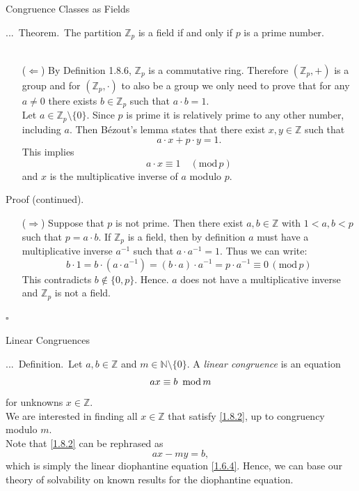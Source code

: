 \documentclass[smaller,hyperref={CJKbookmarks=true}]{beamer}
\newcommand{\N}{\mathbb{N}} \newcommand{\Z}{\mathbb{Z}} \newcommand{\Q}{\mathbb{Q}}
\newenvironment{PROOF}{{\noindent\!\sf\alert{Proof.}}\\}{\hfill$\square$\\}
\newcounter{zhuo}[subsection]
\renewcommand{\thezhuo}{\thesection.\thesubsection.\arabic{zhuo}}
\newenvironment{DEFINITION}{\stepcounter{zhuo}\alert{\thezhuo.~Definition.\,}}{}
\newenvironment{THEOREM}{\stepcounter{zhuo}\alert{\thezhuo.~Theorem.\,}}{}
\begin{document}
\begin{frame}{Congruence Classes as Fields}
\begin{spacing}{1.1}
\begin{THEOREM}
The partition $\Z_p$ is a field if and only if $p$ is a prime number.\\[4pt]
\end{THEOREM}
\begin{PROOF}
\begin{itemize}
  \item[($\Leftarrow$)] By Definition 1.8.6, $\Z_p$ is a commutative ring. Therefore $(\Z_p,+)$ is a group and for $(\Z_p,\cdot)$ to also be a group we only need to prove that for any $a\neq0$ there exists $b\in\Z_p$ such that $a\cdot b=1$.\\[4pt]
      Let $a\in\Z_p\setminus\{0\}$. Since $p$ is prime it is relatively prime to any other number, including $a$. Then B\'{e}zout's lemma states that there exist $x,y\in\Z$ such that
      \[a\cdot x+p\cdot y=1.\]
      This implies
      \[a\cdot x\equiv 1\quad(\text{mod}\,p)\]
      and $x$ is the multiplicative inverse of $a$ modulo $p$.
\end{itemize}
\newpage
\alert{Proof (continued).}\\[4pt]
\begin{itemize}
  \item[($\Rightarrow$)] Suppose that $p$ is not prime. Then there exist $a,b\in\Z$ with $1<a,b<p$ such that $p=a\cdot b$. If $\Z_p$ is a field, then by definition $a$ must have a multiplicative inverse $a^{-1}$ such that $a\cdot a^{-1}=1$. Thus we can write:
      \[b\cdot1=b\cdot(a\cdot a^{-1})=(b\cdot a)\cdot a^{-1}=p\cdot a^{-1}\equiv0\,(\text{mod}\,p)\]
      This contradicts $b\notin\{0,p\}$. Hence. $a$ does not have a multiplicative inverse and $\Z_p$ is not a field.
\end{itemize}
\end{PROOF}
\end{spacing}
\end{frame}
\begin{frame}[c]{Linear Congruences}
\begin{spacing}{1.1}
\begin{DEFINITION}
Let $a,b\in\Z$ and $m\in\N\setminus\{0\}$. A \emph{linear congruence} is an equation
\begin{equation}\label{1.8.2}
ax\equiv b\enskip\text{mod}\,m
\end{equation}
for unknowns $x\in\Z$.\\[4pt]
\end{DEFINITION}
We are interested in finding all $x\in\Z$ that satisfy \eqref{1.8.2}, up to congruency modulo $m$.\\[4pt]
Note that \eqref{1.8.2} can be rephrased as
\begin{equation}\label{1.8.3}
ax-my=b,
\end{equation}
which is simply the linear diophantine equation \eqref{1.6.4}. Hence, we can
base our theory of solvability on known results for the diophantine
equation.
\end{spacing}
\end{frame}
\end{document}
